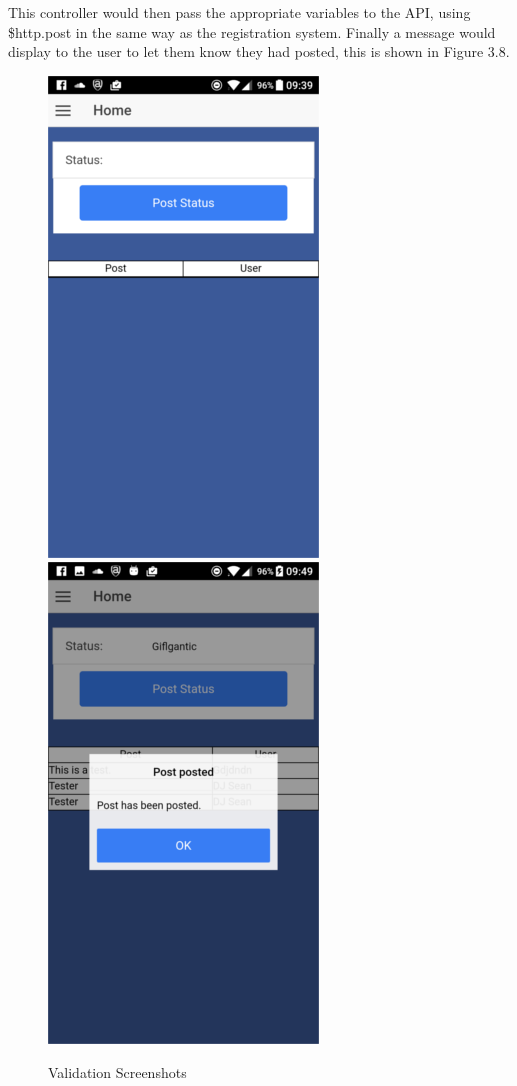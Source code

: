 This controller would then pass the appropriate variables to the API, using \$http.post in the same way as the registration system. Finally a message would display to the user to let them know they had posted, this is shown in Figure 3.8.
\begin{center}
\begin{figure}[H]
\includegraphics[scale=0.5]{images/sc10}
\includegraphics[scale=0.5]{images/sc11}
\caption{Validation Screenshots}
\end{figure}
\end{center}


